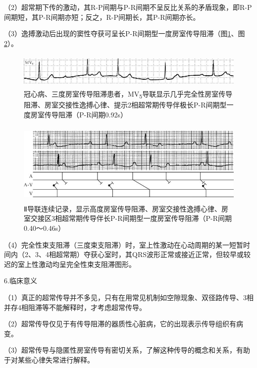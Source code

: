（2）超常期下传的激动，其R-P间期与P-R间期不呈反比关系的矛盾现象，即R-P间期短，其P-R间期亦短；反之，R-P间期长，其P-R间期亦长。

（3）逸搏激动后出现的窦性夺获可呈长P-R间期型一度房室传导阻滞（图\ref{fig28-6}、图\ref{fig28-7}）。

\begin{figure}[!htbp]
 \centering
 \includegraphics[width=5.58333in,height=0.66667in]{./images/Image00466.jpg}
 \captionsetup{justification=centering}
 \caption{冠心病、三度房室传导阻滞患者，MV\textsubscript{5}导联显示几乎完全性房室传导阻滞、房室交接性逸搏心律、提示2相超常期传导伴极长P-R间期型一度房室传导阻滞（P-R间期0.92s）}
 \label{fig28-6}
  \end{figure} 


\begin{figure}[!htbp]
 \centering
 \includegraphics[width=5.04167in,height=1.58333in]{./images/Image00467.jpg}
 \captionsetup{justification=centering}
 \caption{Ⅱ导联连续记录，显示高度房室传导阻滞、房室交接性逸搏心律、房室交接区3相超常期传导伴长P-R间期型一度房室传导阻滞（P-R间期0.40～0.46s）}
 \label{fig28-7}
  \end{figure} 

（4）完全性束支阻滞（三度束支阻滞）时，室上性激动在心动周期的某一短暂时间内（2、3、4相超常期）夺获心室时，其QRS波形正常或接近正常，但较早或较迟的室上性激动均呈完全性束支阻滞图形。

6.临床意义

（1）真正的超常传导并不多见，只有在用常见机制如空隙现象、双径路传导、3相并存4相阻滞等不能解释时，才考虑超常传导。

（2）超常传导仅见于有传导阻滞的器质性心脏病，它的出现表示传导组织有病变。

（3）超常传导与隐匿性房室传导有密切关系，了解这种传导的概念和关系，有助于对某些心律失常进行解释。

\protect\hypertarget{text00035.htmlux5cux23subid417}{}{}

